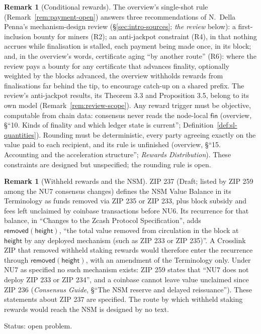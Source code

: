 \documentclass[11pt,a4paper]{article}
\theoremstyle{definition}
\newtheorem{remark}[theorem]{Remark}
\newcommand{\fin}{\mathsf{fin}}
\newcommand{\removed}{\mathsf{removed}}
\begin{document}
\begin{remark}[Conditional rewards]\label{rem:conditional-rewards}
The overview's single-shot rule (Remark~\ref{rem:payment-open}) answers
three recommendations of N.~Della Penna's mechanism-design review
(\S\ref{sec:intro-sources}; \emph{the review} below): a
first-inclusion bounty for miners (R2); an anti-jackpot constraint (R4), in
that nothing accrues while finalisation is stalled, each payment being made
once, in its block; and, in the overview's words, certificate aging ``by
another route'' (R6): where the review pays a bounty for any certificate
that advances finality, optionally weighted by the blocks advanced, the
overview withholds rewards from finalisations far behind the tip, to
encourage catch-up on a shared prefix. The review's anti-jackpot results,
its Theorem 3.3 and Proposition 3.5, belong to its own model
(Remark~\ref{rem:review-scope}). Any reward trigger must be
objective, computable from chain data: consensus never reads the node-local
$\fin$ (overview, \S``10. Kinds of finality and which ledger state is current'';
Definition~\ref{def:sl-quantities}). Rounding must be deterministic, every
party agreeing exactly on the value paid to each recipient, and its rule is
unfinished (overview, \S``15. Accounting and the acceleration structure'';
\emph{Rewards Distribution}). These constraints are designed but unspecified;
the rounding rule is open.
\end{remark}

\begin{remark}[Withheld rewards and the NSM]\label{rem:nsm}
ZIP 237 (Draft; listed by ZIP 259 among the NU7 consensus changes) defines
the NSM Value Balance in its Terminology as funds removed via ZIP 235 or
ZIP 233, plus block subsidy and fees left unclaimed by coinbase transactions
before NU6. Its recurrence for that balance, in ``Changes to the Zcash
Protocol Specification'', adds $\removed(\mathsf{height})$, ``the total value
removed from circulation in the block at $\mathsf{height}$ by any deployed
mechanism (such as ZIP 233 or ZIP 235)''. A Crosslink ZIP that removed
withheld staking rewards would therefore enter the recurrence through
$\removed(\mathsf{height})$, with an amendment of the Terminology only.
Under NU7 as specified no such mechanism exists: ZIP 259 states that ``NU7
does not deploy ZIP 233 or ZIP 234'', and a coinbase cannot leave value
unclaimed since ZIP 236 (\emph{Consensus Guide}, \S``The NSM reserve
and delayed reissuance''). These statements about ZIP 237 are specified. The
route by which withheld staking rewards would reach the NSM is designed by
no text.

Status: open problem.
\end{remark}
\end{document}
